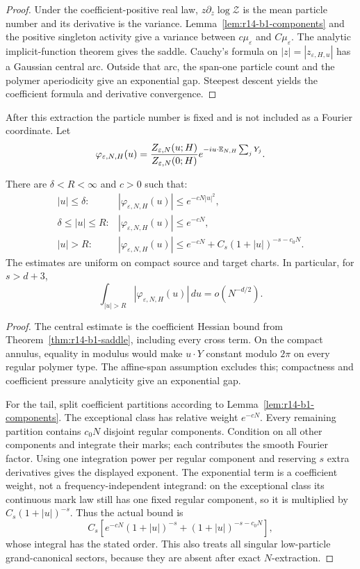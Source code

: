 \begin{proof}
Under the coefficient-positive real law,
\(z\partial_z\log\mathcal Z\) is the mean particle number and its derivative
is the variance.  Lemma~\ref{lem:r14-b1-components} and the positive
singleton activity give a variance between \(c\mu_\varepsilon\) and
\(C\mu_\varepsilon\).  The analytic implicit-function theorem gives the
saddle.  Cauchy's formula on \(|z|=|z_{\varepsilon,H,u}|\) has a Gaussian
central arc.  Outside that arc, the span-one particle count and the polymer
aperiodicity give an exponential gap.  Steepest descent yields the coefficient
formula and derivative convergence.
\end{proof}

After this extraction the particle number is fixed and is not included as a
Fourier coordinate.  Let
\[
 \varphi_{\varepsilon,N,H}(u)
 ={Z_{\varepsilon,N}(u;H)\over Z_{\varepsilon,N}(0;H)}
 e^{-iu\cdot\mathbb E_{N,H}\sum_jY_j}.
\]

\begin{theorem}
\label{thm:r14-b1-fourier}
There are \(\delta<R<\infty\) and \(c>0\) such that:
\[
\begin{array}{ll}
|u|\le\delta:&
 |\varphi_{\varepsilon,N,H}(u)|
 \le e^{-cN|u|^2},\\
\delta\le|u|\le R:&
 |\varphi_{\varepsilon,N,H}(u)|
 \le e^{-cN},\\
|u|>R:&
 |\varphi_{\varepsilon,N,H}(u)|
 \le e^{-cN}+C_s(1+|u|)^{-s-c_0N}.
\end{array}
\]
The estimates are uniform on compact source and target charts.  In
particular, for \(s>d+3\),
\[
 \int_{|u|>R}|\varphi_{\varepsilon,N,H}(u)|\,du
 =o(N^{-d/2}).
\]
\end{theorem}

\begin{proof}
The central estimate is the coefficient Hessian bound from
Theorem~\ref{thm:r14-b1-saddle}, including every cross term.  On the compact
annulus, equality in modulus would make \(u\cdot Y\) constant modulo
\(2\pi\) on every regular polymer type.  The affine-span assumption excludes
this; compactness and coefficient pressure analyticity give an exponential
gap.

For the tail, split coefficient partitions according to
Lemma~\ref{lem:r14-b1-components}.  The exceptional class has relative
weight \(e^{-cN}\).  Every remaining partition contains \(c_0N\) disjoint
regular components.  Condition on all other components and integrate their
marks; each contributes the smooth Fourier factor.  Using one integration
power per regular component and reserving \(s\) extra derivatives gives the
displayed exponent.  The exponential term is a coefficient weight, not a
frequency-independent integrand: on the exceptional class its continuous
mark law still has one fixed regular component, so it is multiplied by
\(C_s(1+|u|)^{-s}\).  Thus the actual bound is
\[
 C_s\left[e^{-cN}(1+|u|)^{-s}
 +(1+|u|)^{-s-c_0N}\right],
\]
whose integral has the stated order.  This also treats all singular
low-particle grand-canonical sectors, because they are absent after exact
\(N\)-extraction.
\end{proof}

